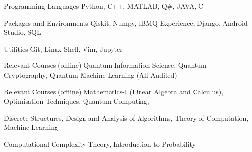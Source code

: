 

\begin{cvskills}

  \cvskill
    {Programming Languages} %
    {Python, C++, MATLAB, Q\#, JAVA, C} %

  \cvskill
    {Packages and Environments} %
    {Qiskit, Numpy, IBMQ Experience, Django, Android Studio, SQL} %
    

  \cvskill
    {Utilities} %
    {Git, Linux Shell, Vim, Jupyter} %


  \cvskill
    {Relevant Courses (online)} %
    {Quantum Information Science, Quantum Cryptography, Quantum Machine Learning (All Audited)} %

    
  \cvskill
    {Relevant Courses (offline)}
    {Mathematics-I (Linear Algebra and Calculus), Optimisation Techniques, Quantum Computing, } 
    
  \cvskill
  {}
  {Discrete Structures, Design and Analysis of Algorithms, Theory of Computation, Machine Learning}
  
  \cvskill
  {}
  {Computational Complexity Theory, Introduction to Probability}

\end{cvskills}
